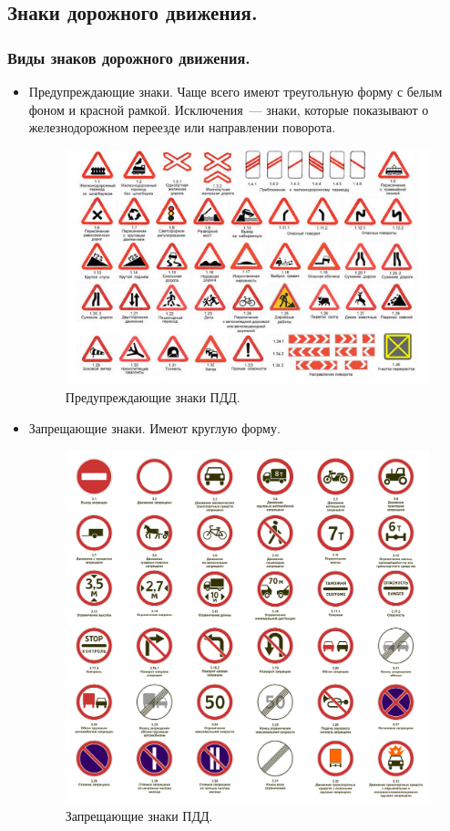 \documentclass[12pt]{article}
\begin{document}
	\subsection{Знаки дорожного движения.}
	\subsubsection{Виды знаков дорожного движения.}
	\begin{itemize}
		\item Предупреждающие знаки. Чаще всего имеют треугольную форму с белым фоном и красной рамкой. Исключения~--- знаки, которые показывают о железнодорожном переезде или направлении поворота.
		\begin{figure}[H]
			\includegraphics[height=0.6\textwidth]{extra-materials/Предупреждающие-знаки-ПДД}
			\caption{Предупреждающие знаки ПДД.}
		\end{figure}
		\item Запрещающие знаки. Имеют круглую форму.
		\begin{figure}[H]
			\includegraphics[height=0.55\textwidth]{extra-materials/Запрещающие-знаки-ПДД}
			\caption{Запрещающие знаки ПДД.}
		\end{figure}
	\end{itemize}
\end{document}
